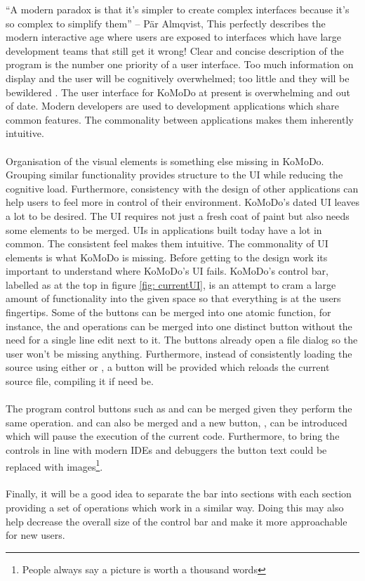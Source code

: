 \graphicspath{ {images/design/} }
``A modern paradox is that it's simpler to create complex interfaces because it's so complex to simplify them'' – P{\"a}r Almqvist, This perfectly describes the modern interactive age where users are exposed to interfaces which have large development teams that still get it wrong! Clear and concise description of the program is the number one priority of a user interface. Too much information on display and the user will be cognitively overwhelmed; too little and they will be bewildered \cite{design_principles}. The user interface for KoMoDo at present is overwhelming and out of date. Modern developers are used to development applications which share common features. The commonality between applications makes them inherently intuitive.\\\\
%
Organisation of the visual elements is something else missing in KoMoDo. Grouping similar functionality provides structure to the UI while reducing the cognitive load. Furthermore, consistency with the design of other applications can help users to feel more in control of their environment\cite{design_principles_two}.
KoMoDo's dated UI leaves a lot to be desired. The UI requires not just a fresh coat of paint but also needs some elements to be merged. UIs in applications built today have a lot in common. The consistent feel makes them intuitive. The commonality of UI elements is what KoMoDo is missing. Before getting to the design work its important to understand where KoMoDo's UI fails.
%
KoMoDo's control bar, labelled as  at the top in figure \ref{fig: currentUI}, is an attempt to cram a large amount of functionality into the given space so that everything is at the users fingertips. Some of the buttons can be merged into one atomic function, for instance, the  and  operations can be merged into one distinct button without the need for a single line edit next to it. The buttons already open a file dialog so the user won't be missing anything. Furthermore, instead of consistently loading the source using either  or , a  button will be provided which reloads the current source file, compiling it if need be.\\\\
%
The program control buttons such as  and  can be merged given they perform the same operation.  and  can also be merged and a new button, , can be introduced which will pause the execution of the current code. Furthermore, to bring the controls in line with modern IDEs and debuggers the button text could be replaced with images\footnote{People always say a picture is worth a thousand words}.\\\\
%
Finally, it will be a good idea to separate the bar into sections with each section providing a set of operations which work in a similar way. Doing this may also help decrease the overall size of the control bar and make it more approachable for new users.

